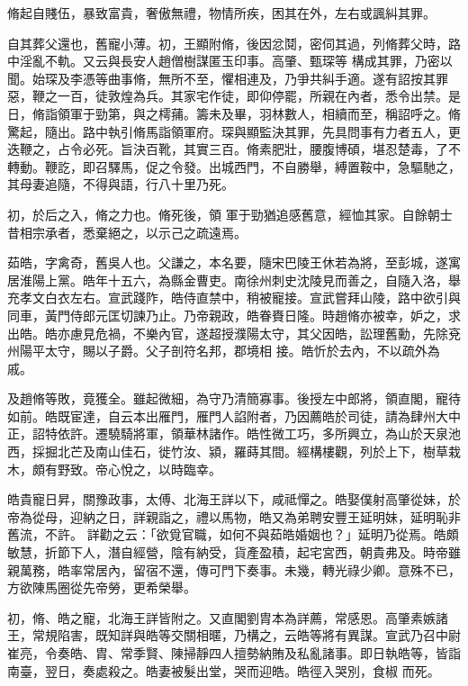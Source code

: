 \begin{pinyinscope}
 脩起自賤伍，暴致富貴，奢傲無禮，物情所疾，困其在外，左右或諷糾其罪。



 自其葬父還也，舊寵小薄。初，王顯附脩，後因忿鬩，密伺其過，列脩葬父時，路中淫亂不軌。又云與長安人趙僧樹謀匿玉印事。高肇、甄琛等
 構成其罪，乃密以聞。始琛及李憑等曲事脩，無所不至，懼相連及，乃爭共糾手適。遂有詔按其罪惡，鞭之一百，徒敦煌為兵。其家宅作徒，即仰停罷，所親在內者，悉令出禁。是日，脩詣領軍于勁第，與之樗蒱。籌未及畢，羽林數人，相續而至，稱詔呼之。脩驚起，隨出。路中執引脩馬詣領軍府。琛與顯監決其罪，先具問事有力者五人，更迭鞭之，占令必死。旨決百靴，其實三百。脩素肥壯，腰腹博碩，堪忍楚毒，了不轉動。鞭訖，即召驛馬，促之令發。出城西門，不自勝舉，縛置鞍中，急驅馳之，其母妻追隨，不得與語，行八十里乃死。



 初，於后之入，脩之力也。脩死後，領
 軍于勁猶追感舊意，經恤其家。自餘朝士昔相宗承者，悉棄絕之，以示己之疏遠焉。



 茹皓，字禽奇，舊吳人也。父謙之，本名要，隨宋巴陵王休若為將，至彭城，遂寓居淮陽上黨。皓年十五六，為縣金曹吏。南徐州刺史沈陵見而善之，自隨入洛，舉充孝文白衣左右。宣武踐阼，皓侍直禁中，稍被寵接。宣武嘗拜山陵，路中欲引與同車，黃門侍郎元匡切諫乃止。乃帝親政，皓眷賚日隆。時趙脩亦被幸，妒之，求出皓。皓亦慮見危禍，不樂內官，遂超授濮陽太守，其父因皓，訟理舊勳，先除兗州陽平太守，賜以子爵。父子剖符名邦，郡境相
 接。皓忻於去內，不以疏外為戚。



 及趙脩等敗，竟獲全。雖起微細，為守乃清簡寡事。後授左中郎將，領直閣，寵待如前。皓既宦達，自云本出雁門，雁門人諂附者，乃因薦皓於司徒，請為肆州大中正，詔特依許。遷驍騎將軍，領華林諸作。皓性微工巧，多所興立，為山於天泉池西，採掘北芒及南山佳石，徙竹汝、潁，羅蒔其間。經構樓觀，列於上下，樹草栽木，頗有野致。帝心悅之，以時臨幸。



 皓貴寵日昇，關豫政事，太傅、北海王詳以下，咸祗憚之。皓娶僕射高肇從妹，於帝為從母，迎納之日，詳親詣之，禮以馬物，皓又為弟聘安豐王延明妹，延明恥非舊流，不許。
 詳勸之云：「欲覓官職，如何不與茹皓婚姻也？」延明乃從焉。皓頗敏慧，折節下人，潛自經營，陰有納受，貨產盈積，起宅宮西，朝貴弗及。時帝雖親萬務，皓率常居內，留宿不還，傳可門下奏事。未幾，轉光祿少卿。意殊不已，方欲陳馬圈從先帝勞，更希榮舉。



 初，脩、皓之寵，北海王詳皆附之。又直閣劉胄本為詳薦，常感恩。高肇素嫉諸王，常規陷害，既知詳與皓等交關相暱，乃構之，云皓等將有異謀。宣武乃召中尉崔亮，令奏皓、胄、常季賢、陳掃靜四人擅勢納賄及私亂諸事。即日執皓等，皆詣南臺，翌日，奏處殺之。皓妻被髮出堂，哭而迎皓。皓徑入哭別，食椒
 而死。




\end{pinyinscope}
